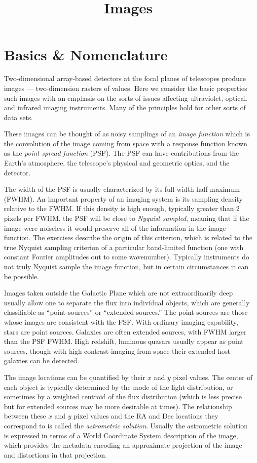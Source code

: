 \title{\bf Images}

\section{Basics \& Nomenclature}

Two-dimensional array-based detectors at the focal planes of
telescopes produce images --- two-dimension rasters of values.  Here
we consider the basic properties such images with an emphasis on the
sorts of issues affecting ultraviolet, optical, and infrared imaging
instruments. Many of the principles hold for other sorts of data sets.

These images can be thought of as noisy samplings of an {\it image
function} which is the convolution of the image coming from space with
a response function known as the {\it point spread function}
(PSF). The PSF can have contributions from the Earth's atmosphere, the
telescope's physical and geometric optics, and the detector.

The width of the PSF is usually characterized by its full-width
half-maximum (FWHM). An important property of an imaging system is its
sampling density relative to the FWHM. If this density is high enough,
typically greater than 2 pixels per FWHM, the PSF will be close to
{\it Nyquist sampled}, meaning that if the image were noiseless it
would preserve all of the information in the image function. The
exercises describe the origin of this criterion, which is related to
the true Nyquist sampling criterion of a particular band-limited
function (one with constant Fourier amplitudes out to some
wavenumber). Typically instruments do not truly Nyquist sample the
image function, but in certain circumstances it can be possible.

Images taken outside the Galactic Plane which are not extraordinarily
deep usually allow one to separate the flux into individual objects,
which are generally classifiable as ``point sources'' or ``extended
sources.'' The point sources are those whose images are consistent
with the PSF. With ordinary imaging capability, stars are point
sources. Galaxies are often extended sources, with FWHM larger than
the PSF FWHM. High redshift, luminous quasars usually appear as point
sources, though with high contrast imaging from space their extended
host galaxies can be detected.

The image locations can be quantified by their $x$ and $y$ pixel
values. The center of each object is typically determined by the mode
of the light distribution, or sometimes by a weighted centroid of the
flux distribution (which is less precise but for extended sources may
be more desirable at times). The relationship between these $x$ and
$y$ pixel values and the RA and Dec locations they correspond to is
called the {\it astrometric solution}. Usually the astrometric
solution is expressed in terms of a World Coordinate System
description of the image, which provides the metadata encoding an
approximate projection of the image and distortions in that
projection.

